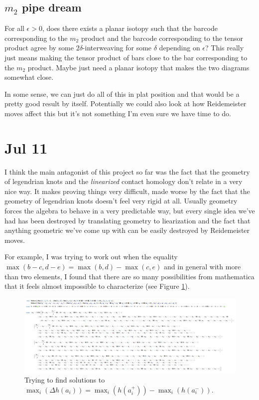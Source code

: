 \documentclass[11pt,oneside]{amsart}
\begin{document}
\subsection{$m_2$ pipe dream}
For all $\epsilon>0$, does there exists a planar isotopy such that the barcode corresponding to the $m_2$ product and the barcode corresponding to the tensor product agree by some $2\delta$-interweaving for some $\delta$ depending on $\epsilon$? This really just means making the tensor product of bars close to the bar corresponding to the $m_2$ product. Maybe just need a planar isotopy that makes the two diagrams somewhat close.

In some sense, we can just do all of this in plat position and that would be a pretty good result by itself. Potentially we could also look at how Reidemeister moves affect this but it's not something I'm even sure we have time to do.

\section{Jul 11}

I think the main antagonist of this project so far was the fact that the geometry of legendrian knots and the \textit{linearized} contact homology don't relate in a very nice way. It makes proving things very difficult, made worse by the fact that the geometry of legendrian knots doesn't feel very rigid at all. Usually geometry forces the algebra to behave in a very predictable way, but every single idea we've had has been destroyed by translating geometry to liearization and the fact that anything geometric we've come up with can be easily destroyed by Reidemeister moves.

For example, I was trying to work out when the equality $\max(b-c,d-e)=\max(b,d)-\max(c,e)$ and in general with more than two elements, I found that there are so many possibilities from mathematica that it feels almost impossible to characterize (see Figure \ref{fig:mathematica}).

\begin{figure}
    \centering
    \includegraphics[width=\linewidth]{Journals/mathematicastuff.png}
    \caption{Trying to find solutions to $\max_i(\Delta h(a_i))=\max_i(h(a_i^+))-\max_i(h(a_i^-))$.}
    \label{fig:mathematica}
\end{figure}
\end{document}
